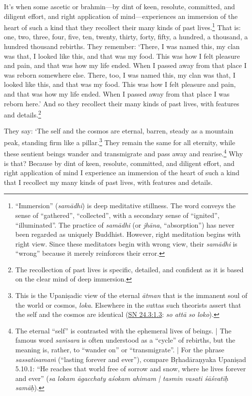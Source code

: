 \documentclass[12pt,openany]{book}%
\begin{document}
It’s when some ascetic or brahmin—by dint of keen, resolute, committed, and diligent effort, and right application of mind—experiences an immersion of the heart of such a kind that they recollect their many kinds of past lives.\footnote{“Immersion” (\textit{\textsanskrit{samādhi}}) is deep meditative stillness. The word conveys the sense of “gathered”, “collected”, with a secondary sense of “ignited”, “illuminated”. The practice of \textit{\textsanskrit{samādhi}} (or \textit{\textsanskrit{jhāna}}, “absorption”) has never been regarded as uniquely Buddhist. However, right meditation begins with right view. Since these meditators begin with wrong view, their \textit{\textsanskrit{samādhi}} is “wrong” because it merely reinforces their error. } That is: one, two, three, four, five, ten, twenty, thirty, forty, fifty, a hundred, a thousand, a hundred thousand rebirths. They remember: ‘There, I was named this, my clan was that, I looked like this, and that was my food. This was how I felt pleasure and pain, and that was how my life ended. When I passed away from that place I was reborn somewhere else. There, too, I was named this, my clan was that, I looked like this, and that was my food. This was how I felt pleasure and pain, and that was how my life ended. When I passed away from that place I was reborn here.’ And so they recollect their many kinds of past lives, with features and details.\footnote{The recollection of past lives is specific, detailed, and confident as it is based on the clear mind of deep immersion. } 

They say: ‘The self and the cosmos are eternal, barren, steady as a mountain peak, standing firm like a pillar.\footnote{This is the \textsanskrit{Upaniṣadic} view of the eternal \textit{\textsanskrit{ātman}} that is the immanent soul of the world or cosmos, \textit{loka}. Elsewhere in the suttas such theorists assert that the self and the cosmos are identical (\href{https://suttacentral.net/sn24.3/en/sujato\#1.3}{SN 24.3:1.3}: \textit{so \textsanskrit{attā} so loko}). } They remain the same for all eternity, while these sentient beings wander and transmigrate and pass away and rearise.\footnote{The eternal “self” is contrasted with the ephemeral lives of beings. | The famous word \textit{\textsanskrit{saṁsara}} is often understood as a “cycle” of rebirths, but the meaning is, rather, to “wander on” or “transmigrate”. | For the phrase \textit{\textsanskrit{sassatisamaṁ}} (“lasting forever and ever”), compare \textsanskrit{Bṛhadāraṇyaka} \textsanskrit{Upaniṣad} 5.10.1: “He reaches that world free of sorrow and snow, where he lives forever and ever” (\textit{sa lokam \textsanskrit{āgacchaty} \textsanskrit{aśokam} ahimam | tasmin vasati \textsanskrit{śāśvatīḥ} \textsanskrit{samāḥ}}). } Why is that? Because by dint of keen, resolute, committed, and diligent effort, and right application of mind I experience an immersion of the heart of such a kind that I recollect my many kinds of past lives, with features and details. 
\end{document}
